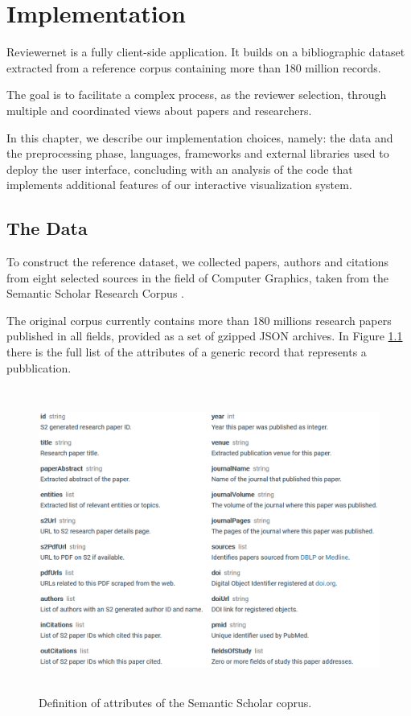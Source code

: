 \chapter{Implementation}
\label{sec:impl}
Reviewernet is a fully client-side application. It builds on a bibliographic dataset extracted from a reference corpus containing more than 180 million records.

The goal is to facilitate a complex process, as the reviewer selection, through multiple and coordinated views about papers and researchers.

In this chapter, we describe our implementation choices, namely: the data and the preprocessing phase, languages, frameworks and external libraries used to deploy the user interface, concluding with an analysis of the code that implements additional features of our interactive visualization system.
\section{The Data}
To construct the reference dataset, we collected papers, authors and citations from eight selected sources in the field of Computer Graphics, taken from the Semantic Scholar Research Corpus \cite{ammar:18}. 

The original corpus currently contains more than 180 millions research papers published in all fields, provided as a set of gzipped JSON archives. In Figure \ref{jsonfields} there is the full list of the attributes of a generic record that represents a pubblication.

\begin{figure}[!ht]
    \centering
    \includegraphics[height=10cm]{fig/corpusfields.png}
    \caption{Definition of attributes of the Semantic Scholar coprus.\label{jsonfields}}
\end{figure}

